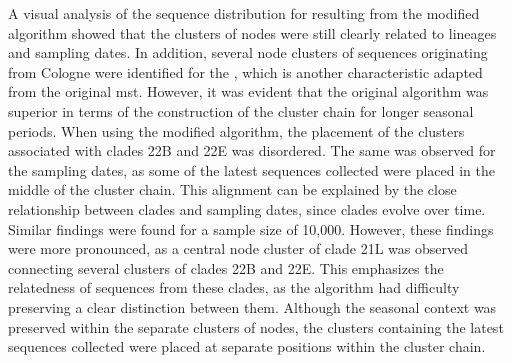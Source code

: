 A visual analysis of the sequence distribution for  resulting from the modified algorithm showed that the clusters of nodes were still clearly related to lineages and sampling dates. In addition, several node clusters of sequences originating from Cologne were identified for the , which is another characteristic adapted from the original \acrshort{mst}. However, it was evident that the original algorithm was superior in terms of the construction of the cluster chain for longer seasonal periods. When using the modified algorithm, the placement of the clusters associated with clades 22B and 22E was disordered. The same was observed for the sampling dates, as some of the latest sequences collected were placed in the middle of the cluster chain. This alignment can be explained by the close relationship between clades and sampling dates, since clades evolve over time.  
Similar findings were found for a sample size of 10,000. However, these findings were more pronounced, as a central node cluster of clade 21L was observed connecting several clusters of clades 22B and 22E. This emphasizes the relatedness of sequences from these clades, as the algorithm had difficulty preserving a clear distinction between them. 
Although the seasonal context was preserved within the separate clusters of nodes, the clusters containing the latest sequences collected were placed at separate positions within the cluster chain.

